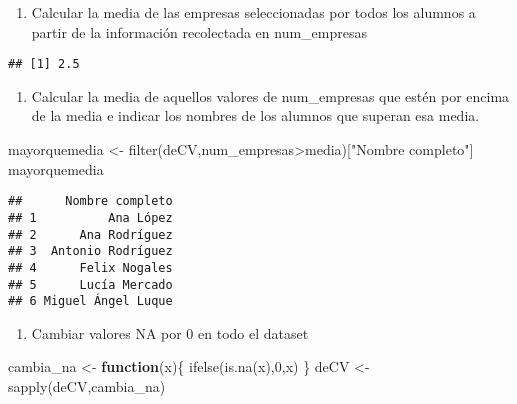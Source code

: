\documentclass[
]{book}
\newenvironment{Shaded}{\begin{snugshade}}{\end{snugshade}}
\newcommand{\ControlFlowTok}[1]{\textcolor[rgb]{0.13,0.29,0.53}{\textbf{#1}}}
\newcommand{\DecValTok}[1]{\textcolor[rgb]{0.00,0.00,0.81}{#1}}
\newcommand{\FunctionTok}[1]{\textcolor[rgb]{0.00,0.00,0.00}{#1}}
\newcommand{\NormalTok}[1]{#1}
\newcommand{\OtherTok}[1]{\textcolor[rgb]{0.56,0.35,0.01}{#1}}
\newcommand{\SpecialCharTok}[1]{\textcolor[rgb]{0.00,0.00,0.00}{#1}}
\newcommand{\StringTok}[1]{\textcolor[rgb]{0.31,0.60,0.02}{#1}}
\providecommand{\tightlist}{%
  \setlength{\itemsep}{0pt}\setlength{\parskip}{0pt}}
\begin{document}
\begin{enumerate}
\def\labelenumi{\arabic{enumi}.}
\setcounter{enumi}{13}
\tightlist
\item
  Calcular la media de las empresas seleccionadas por todos los alumnos a partir de la información
  recolectada en num\_empresas
\end{enumerate}

\begin{Shaded}
\end{Shaded}

\begin{verbatim}
## [1] 2.5
\end{verbatim}

\begin{enumerate}
\def\labelenumi{\arabic{enumi}.}
\setcounter{enumi}{14}
\tightlist
\item
  Calcular la media de aquellos valores de num\_empresas que estén por encima de la media e indicar los
  nombres de los alumnos que superan esa media.
\end{enumerate}

\begin{Shaded}
\begin{Highlighting}[]
\NormalTok{mayorquemedia }\OtherTok{\textless{}{-}} \FunctionTok{filter}\NormalTok{(deCV,num\_empresas}\SpecialCharTok{\textgreater{}}\NormalTok{media)[}\StringTok{"Nombre completo"}\NormalTok{]}
\NormalTok{mayorquemedia}
\end{Highlighting}
\end{Shaded}

\begin{verbatim}
##      Nombre completo
## 1          Ana López
## 2      Ana Rodríguez
## 3  Antonio Rodríguez
## 4      Felix Nogales
## 5      Lucía Mercado
## 6 Miguel Ángel Luque
\end{verbatim}

\begin{enumerate}
\def\labelenumi{\arabic{enumi}.}
\setcounter{enumi}{15}
\tightlist
\item
  Cambiar valores NA por 0 en todo el dataset
\end{enumerate}

\begin{Shaded}
\begin{Highlighting}[]
\NormalTok{cambia\_na }\OtherTok{\textless{}{-}} \ControlFlowTok{function}\NormalTok{(x)\{}
  \FunctionTok{ifelse}\NormalTok{(}\FunctionTok{is.na}\NormalTok{(x),}\DecValTok{0}\NormalTok{,x)}
\NormalTok{\}}
\NormalTok{deCV }\OtherTok{\textless{}{-}} \FunctionTok{sapply}\NormalTok{(deCV,cambia\_na)}
\end{Highlighting}
\end{Shaded}
\end{document}
